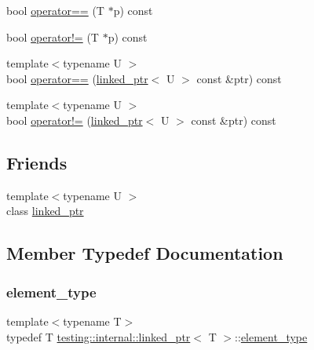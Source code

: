 \begin{DoxyCompactItemize}
\item 
bool \mbox{\hyperlink{classtesting_1_1internal_1_1linked__ptr_ad87ac8ff5543b6fad66e2f3c9844581a}{operator==}} (T $\ast$p) const
\item 
bool \mbox{\hyperlink{classtesting_1_1internal_1_1linked__ptr_a10305395af92bd2fec7bca085cabc99c}{operator!=}} (T $\ast$p) const
\item 
{\footnotesize template$<$typename U $>$ }\\bool \mbox{\hyperlink{classtesting_1_1internal_1_1linked__ptr_a79306e959a4ae7b3a9da641d2ba06ce6}{operator==}} (\mbox{\hyperlink{classtesting_1_1internal_1_1linked__ptr}{linked\+\_\+ptr}}$<$ U $>$ const \&ptr) const
\item 
{\footnotesize template$<$typename U $>$ }\\bool \mbox{\hyperlink{classtesting_1_1internal_1_1linked__ptr_a4801114a83a9e12b08f90e0d28318f26}{operator!=}} (\mbox{\hyperlink{classtesting_1_1internal_1_1linked__ptr}{linked\+\_\+ptr}}$<$ U $>$ const \&ptr) const
\end{DoxyCompactItemize}
\subsection*{Friends}
\begin{DoxyCompactItemize}
\item 
{\footnotesize template$<$typename U $>$ }\\class \mbox{\hyperlink{classtesting_1_1internal_1_1linked__ptr_a7763f286ca03a7f7363a033d996c8c1c}{linked\+\_\+ptr}}
\end{DoxyCompactItemize}


\subsection{Member Typedef Documentation}
\mbox{\label{classtesting_1_1internal_1_1linked__ptr_a295c7d1ee4100d916514c4e4385a0063}} 
\subsubsection{\texorpdfstring{element\_type}{element\_type}}
{\footnotesize\ttfamily template$<$typename T$>$ \\
typedef T \mbox{\hyperlink{classtesting_1_1internal_1_1linked__ptr}{testing\+::internal\+::linked\+\_\+ptr}}$<$ T $>$\+::\mbox{\hyperlink{classtesting_1_1internal_1_1linked__ptr_a295c7d1ee4100d916514c4e4385a0063}{element\+\_\+type}}}



